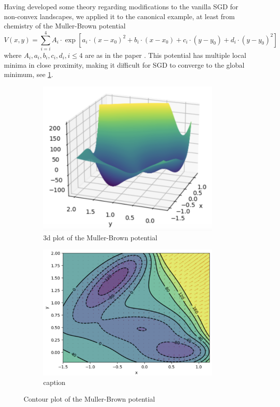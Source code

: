 \documentclass{article}
\begin{document}
Having developed some theory regarding modifications to the vanilla SGD for non-convex landscapes, we applied it to the canonical example, at least from chemistry \cite{muller1979location} of the Muller-Brown potential 
\begin{equation}
	V(x,y) = \displaystyle\sum^{4}_{i=i}A_{i}\cdot \exp[a_{i}\cdot(x-x_{0})^{2}+b_{i}\cdot(x-x_{0})+c_{i}\cdot(y-y_{0})+d_{i}\cdot (y-y_{0})^{2}] 
\end{equation}
where $A_{i}, a_{i}, b_{i}, c_{i}, d_{i}, i\leq 4$ are as in the paper \cite{muller1979location}. This potential has multiple local minima in close proximity, making it difficult for SGD to converge to the global minimum, see \ref{fig: muller-brown 3d}.

    \begin{figure}[H]
\begin{subfigure}{0.5\textwidth}
  \centering
  \includegraphics[width=0.8\linewidth]{images/MullerB-potential-plot-3d.png}
  \caption{3d plot of the Muller-Brown potential}
  \label{fig: muller-brown 3d}
\end{subfigure}%
\begin{subfigure}{0.5\textwidth}
  \centering
  \includegraphics[width=0.8\linewidth]{images/MullerB-contour-with-grad-field.png}
  \caption{ caption}
  \label{fig:  muller-brown contour}
\end{subfigure}
\caption{Contour plot of the Muller-Brown potential}
\label{fig:  muller-brown plots}
\end{figure}
\end{document}
